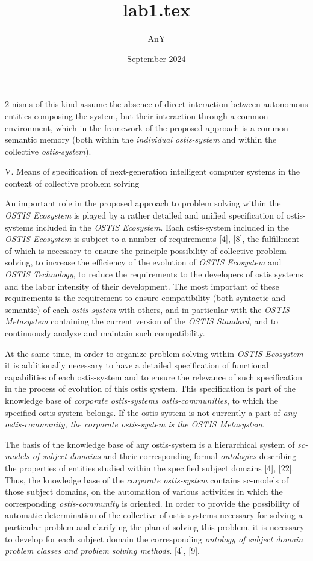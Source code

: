 \documentclass[9pt, letterpaper]{article}
\title{lab1.tex}
\author{AnY}
\date{September 2024}
\begin{document}
\begin{spacing}{0.97}
\begin{multicols} 2
\noindent
nisms of this kind assume the absence of direct interaction between autonomous entities composing the system,
but their interaction through a common environment,
which in the framework of the proposed approach is a
common semantic memory (both within the 
\textit{individual ostis-system}
and within the collective \textit{ostis-system}).
\begin{center}
V. Means of specification of next-generation intelligent
computer systems in the context of collective problem
solving
\end{center}

An important role in the proposed approach to problem
solving within the \textit{OSTIS Ecosystem} is played by a
rather detailed and unified specification of ostis-systems
included in the \textit{OSTIS Ecosystem}. Each ostis-system
included in the \textit{OSTIS Ecosystem} is subject to a number
of requirements [4], [8], the fulfillment of which is
necessary to ensure the principle possibility of collective problem solving, to increase the efficiency of the
evolution of \textit{OSTIS Ecosystem} and \textit{OSTIS Technology},
to reduce the requirements to the developers of ostis systems and the labor intensity of their development. The
most important of these requirements is the requirement
to ensure compatibility (both syntactic and semantic)
of each \textit{ostis-system} with others, and in particular with
the \textit{OSTIS Metasystem} containing the current version of
the \textit{OSTIS Standard}, and to continuously analyze and
maintain such compatibility.

At the same time, in order to organize problem solving
within \textit{OSTIS Ecosystem} it is additionally necessary to
have a detailed specification of functional capabilities of
each ostis-system and to ensure the relevance of such
specification in the process of evolution of this ostis system. This specification is part of the knowledge base
of \textit{corporate ostis-systems ostis-communities}, to which
the specified ostis-system belongs. If the ostis-system is
not currently a part of \textit{any ostis-community, \emph{the} corporate
ostis-system \emph{is the} OSTIS Metasystem}.

The basis of the knowledge base of any ostis-system
is a hierarchical system of \textit{sc-models of subject domains}
and their corresponding formal \textit{ontologies} describing the
properties of entities studied within the specified subject
domains [4], [22]. Thus, the knowledge base of the \textit{corporate ostis-system} contains sc-models of those subject
domains, on the automation of various activities in which
the corresponding \textit{ostis-community} is oriented. In order
to provide the possibility of automatic determination of
the collective of ostis-systems necessary for solving a
particular problem and clarifying the plan of solving
this problem, it is necessary to develop for each subject
domain the corresponding \textit{ontology of subject domain
problem classes and problem solving methods}. [4], [9].


\end{multicols}
\end{spacing}
\end{document}
